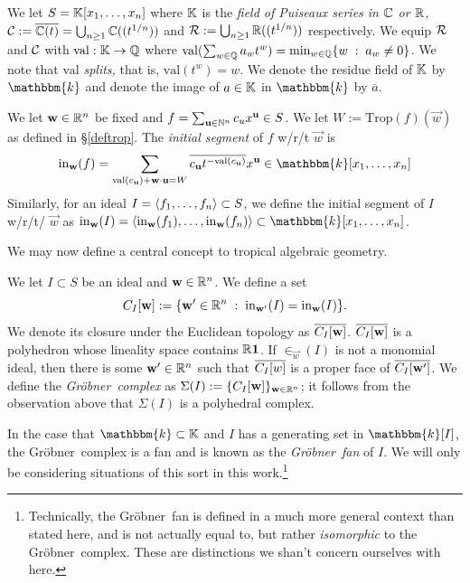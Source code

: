 \documentclass[12pt,letter]{article}
\newcommand{\trop}{\mathrm{Trop}}
\newcommand{\gro}{Gr\"obner~}
\newcommand{\val}{\mathrm{val}}
\newcommand{\res}[1]{\overline{#1}}
\newcommand{\kk}{\mathbbm{k}}
\newcommand{\ins}{\mathrm{in}}
\begin{document}
We let $S={\mathbb K}[x_1,\hdots,x_n]$ where ${\mathbb K}$ is the \emph{field of Puiseaux series in ${\mathbb C}$ or ${\mathbb R}$,} ${\mathcal C}:=\overline{{\mathbb C}(t)}=\bigcup_{n\geq 1}{\mathbb C}((t^{1/n}))$ and ${\mathcal R}:=\bigcup_{n\geq 1}{\mathbb R}((t^{1/n}))$ respectively. We equip ${\mathcal R}$ and ${\mathcal C}$ with $\val:\KK\to \QQ$ where $\val(\sum_{w\in \QQ}a_wt^w)=\min_{w\in \QQ}\{w\;:\;a_w\neq 0\}$. We note that $\val$ \emph{splits,} that is, $\val(t^w)=w$. We denote the residue field of ${\mathbb K}$ by $\kk$ and denote the image of $a\in {\mathbb K}$ in $\kk$ by $\res{a}$.
\begin{definition}
	We let $\mathbf{w}\in {\mathbb R}^{n}$ be fixed and $f=\sum_{\mathbf{u}\in {\mathbb N}^n}c_ux^\mathbf{u}\in S$. We let $W:=\trop(f)(\vec{w})$ as defined in \S\ref{deftrop}. The \emph{initial segment} of $f$ w/r/t $\vec{w}$ is $$\ins_{\vec{w}}(f)=\sum_{\val({c_\vec{u}})+\vec{w}\cdot\vec{u}=W}\res{c_\vec{u}t^{-\val({c_\vec{u}})}}x^\vec{u}\in \kk[x_1,\hdots,x_n]$$                                              Similarly, for an ideal $I=\langle f_1,\hdots,f_n \rangle\subset S$, we define the initial segment of $I$ w/r/t/ $\vec{w}$  as $\ins_\vec{w}(I)=\idl{\ins_\vec{w}(f_1),\hdots,\ins_\vec{w}(f_n)}\subset \kk[x_1,\hdots,x_n]$.                         
\end{definition}
We may now define a central concept to tropical algebraic geometry.
\begin{definition}
	We let $I\subset S$ be an ideal and $\mathbf{w}\in {\mathbb R}^n$. We define a set $$C_I[\vec{w}]:=\{\vec{w}'\in \RR^n\;:\;\ins_{\vec{w}'}(I)=\ins_\vec w(I)\}.$$ We denote its closure under the Euclidean topology as $\overline{C_I[\mathbf{w}]}$. $\overline{C_I[\mathbf{w}]}$ is a polyhedron whose lineality space contains ${\mathbb R}\mathbf{1}$. If $\in_\vec{w}(I)$ is not a monomial ideal, then there is some $\mathbf{w}'\in {\mathbb R}^n$ such that $\overline{C_I[w]} $ is a proper face of $\overline{C_I[\mathbf{w'}]}$. We define the \emph{\gro complex} as $\Sigma(I):=\{C_{I}[\mathbf{w}]\}_{\mathbf{w}\in {\mathbb R}^n}$; it follows from the observation above that $\Sigma(I)$ is a polyhedral complex.
\end{definition}
\begin{remark}
In the case that $\kk\subset \KK$ and $I$ has a generating set in $\kk[I]$, the \gro complex is a fan and is known as the \emph{\gro fan} of $I$. We will only be considering situations of this sort in this work.\footnote{Technically, the \gro fan is defined in a much more general context than stated here, and is not actually equal to, but rather \emph{isomorphic} to the \gro complex. These are distinctions we shan't concern ourselves with here. }
\end{remark}
\end{document}
